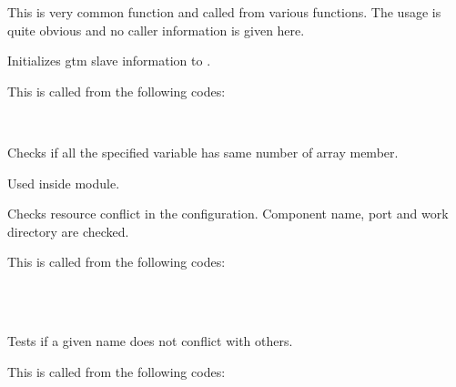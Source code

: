       This is very common function and called from various functions.
      The usage is quite obvious and no caller information is given here.
  
  
      Initializes gtm slave information to .
      
      This is called from the following codes:
      
      \FuncRefHdr
		  \\ \hline
      \FuncRefTrailor
  
  
      Checks if all the specified variable has same number of array member.
      
      Used inside  module.
  
  
      Checks resource conflict in the configuration.
      Component name, port and work directory are checked.
      
      This is called from the following codes:
      
      \FuncRefHdr
		  \\ \vspace{3pt}
		  \\ \hline
      \FuncRefTrailor
  
  
      Tests if a given name does not conflict with others.
      
      This is called from the following codes:
      
      \FuncRefHdr
		  \\ \vspace{3pt}
		  \\ \vspace{3pt}
		  \\ \hline
      \FuncRefTrailor
  
